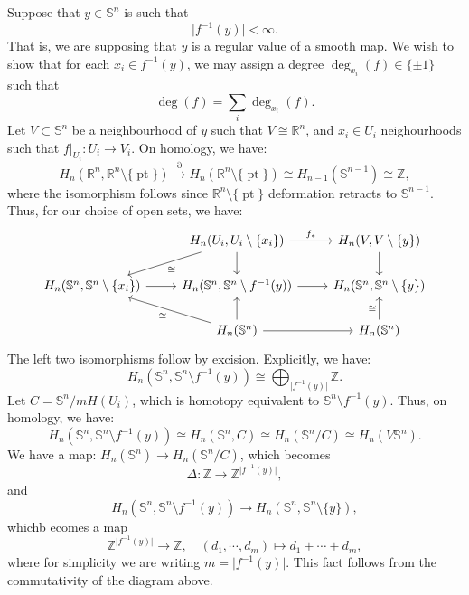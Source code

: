 \documentclass[a4paper]{report}
\theoremstyle{definition}
\theoremstyle{remark}
\theoremstyle{proposition}
\theoremstyle{conjecture}
\theoremstyle{lemma}
\theoremstyle{corollary}
\theoremstyle{exercise}
\newcommand{\on}{\operatorname}
\begin{document}
Suppose that $y \in \mathbb{S}^n$ is such that $$\vert f^{-1}(y)\vert < \infty.$$
That is, we are supposing that $y$ is a regular value of a smooth map. 
We wish to show that for each $x_i \in f^{-1}(y)$, we may assign a degree 
$\deg_{x_i} (f) \in \lbrace \pm 1\rbrace$ such that $$\deg(f) = \sum_i \deg_{x_i}(f).$$
Let $V \subset \mathbb{S}^n$ be a neighbourhood of $y$ such that $V \cong \mathbb{R}^n$, and 
$x_i \in U_i$ neighourhoods such that $f\vert_{U_i} : U_i \to V_i$.
On homology, we have:
$$H_n(\mathbb{R}^n, \mathbb{R}^n\setminus \lbrace \on{pt}\rbrace) \stackrel{\partial}{\longrightarrow} H_n(\mathbb{R}^n\setminus \lbrace \on{pt}\rbrace) \cong H_{n-1}(\mathbb{S}^{n-1}) \cong \mathbb{Z},$$
where the isomorphism follows since $\mathbb{R}^n \setminus \lbrace \on{pt}\rbrace$ deformation retracts to 
$\mathbb{S}^{n-1}$. Thus, for our choice of open sets, we have:
$$\begin{tikzcd}
    & {H_n(U_i, U_i\setminus\lbrace x_i\rbrace)} \arrow[r, "f_\ast"] \arrow[d] \arrow[ld, "\cong"] & {H_n(V,V\setminus \lbrace y\rbrace)} \arrow[d]            \\
{H_n(\mathbb{S}^n,\mathbb{S}^n\setminus\lbrace x_i\rbrace)} \arrow[r] & {H_n(\mathbb{S}^n,\mathbb{S}^n\setminus f^{-1}(y))} \arrow[r]                                & {H_n(\mathbb{S}^n,\mathbb{S}^n\setminus\lbrace y\rbrace)} \\
    & H_n(\mathbb{S}^n) \arrow[r] \arrow[u] \arrow[lu, "\cong"]                                    & H_n(\mathbb{S}^n) \arrow[u, "\cong"]                     
\end{tikzcd}$$
The left two isomorphisms follow by excision.
Explicitly, we have:
$$H_n(\mathbb{S}^n, \mathbb{S}^n \setminus f^{-1}(y)) \cong \bigoplus_{\vert f^{-1}(y)\vert} \mathbb{Z}.$$
Let $C = \mathbb{S}^n/mH(U_i)$, which is homotopy equivalent to $\mathbb{S}^n \setminus f^{-1}(y)$. 
Thus, on homology, we have: 
$$H_n(\mathbb{S}^n, \mathbb{S}^n\setminus f^{-1}(y)) \cong H_n(\mathbb{S}^n, C) \cong H_n(\mathbb{S}^n/C) \cong H_n(V\mathbb{S}^n).$$
We have a map: $H_n(\mathbb{S}^n) \to H_n(\mathbb{S}^n/C)$, which becomes $$\Delta : \mathbb{Z} \longrightarrow \mathbb{Z}^{\vert f^{-1}(y)\vert},$$ 
and 
$$H_n(\mathbb{S}^n, \mathbb{S}^n\setminus f^{-1}(y)) \longrightarrow H_n(\mathbb{S}^n,\mathbb{S}^n\setminus \lbrace y\rbrace),$$ 
whichb ecomes a map 
$$\mathbb{Z}^{\vert f^{-1}(y)\vert} \longrightarrow \mathbb{Z}, \quad (d_1,\cdots,d_m) \longmapsto d_1 + \cdots + d_m,$$
where for simplicity we are writing $m = \vert f^{-1}(y)\vert$.
This fact follows from the commutativity of the diagram above.
\end{document}
